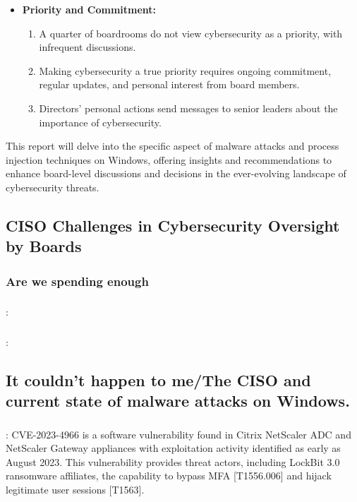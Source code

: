 \documentclass{article}
\begin{document}
\begin{itemize}
  \item \textbf{Priority and Commitment:}
        \begin{enumerate}
          \item A quarter of boardrooms do not view cybersecurity as a priority, with infrequent discussions.
          \item Making cybersecurity a true priority requires ongoing commitment, regular updates, and personal interest from board members.
          \item Directors' personal actions send messages to senior leaders about the importance of cybersecurity.
        \end{enumerate}
\end{itemize}

This report will delve into the specific aspect of malware attacks and process injection techniques on Windows, offering insights and recommendations to enhance board-level discussions and decisions in the ever-evolving landscape of cybersecurity threats.

\subsection{CISO Challenges in Cybersecurity Oversight by Boards}

\subsubsection{Are we spending enough}

\subsubsection{\textcite{FBI:2023}}
\textbf{}: 


\subsubsection{\textcite{Hiscox:2022}}
\textbf{}: 


\subsection{It couldn't happen to me/The CISO and current state of malware attacks on Windows.}

\subsubsection{\textcite{CISA:2023a}}
\textbf{}:  CVE-2023-4966 is a software vulnerability found in Citrix NetScaler ADC and NetScaler Gateway appliances with exploitation activity identified as early as August 2023. This vulnerability provides threat actors, including LockBit 3.0 ransomware affiliates, the capability to bypass MFA [T1556.006] and hijack legitimate user sessions [T1563].
\end{document}
